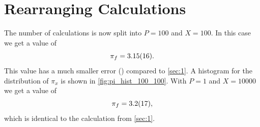 \section{Rearranging Calculations}\label{sec:2}
The number of calculations is now split into $P = \num{100}$ and
$X = \num{100}$. In this case we get a value of
\begin{equation}
	\pi_f = \num{3.15 \pm 0.16}.
\end{equation}
This value has a much smaller error () compared to \cref{sec:1}. A histogram 
for the distribution of $\pi_x$ is shown in \cref{fig:pi_hist_100_100}.
With $P=1$ and $X = \num{10000}$ we get a value of 
\begin{equation}
    \pi_f = \num{3.2\pm 1.7},
\end{equation}
which is identical to the calculation from \cref{sec:1}.

